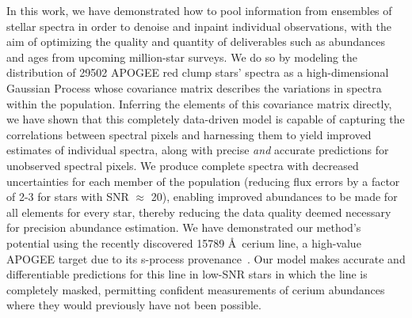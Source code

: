 \documentclass[a4paper,fleqn,usenatbib]{mnras}
\begin{document}
In this work, we have demonstrated how to pool information from ensembles of stellar spectra in order to denoise and inpaint individual observations, with the aim of optimizing the quality and quantity of deliverables such as abundances and ages from upcoming million-star surveys. We do so by modeling the distribution of 29502 APOGEE red clump stars' spectra as a high-dimensional Gaussian Process whose covariance matrix describes the variations in spectra within the population. Inferring the elements of this covariance matrix directly, we have shown that this completely data-driven model is capable of capturing the correlations between spectral pixels and harnessing them to yield improved estimates of individual spectra, along with precise {\it and} accurate predictions for unobserved spectral pixels. We produce complete spectra with decreased uncertainties for each member of the population (reducing flux errors by a factor of 2-3 for stars with SNR $\approx$ 20), enabling improved abundances to be made for all elements for every star, thereby reducing the data quality deemed necessary for precision abundance estimation. We have demonstrated our method's potential using the recently discovered 15789 \AA\ cerium line, a high-value APOGEE target due to its s-process provenance~\citep{Cunha2017}. Our model makes accurate and differentiable predictions for this line in low-SNR stars in which the line is completely masked, permitting confident measurements of cerium abundances where they would previously have not been possible.

\end{document}
